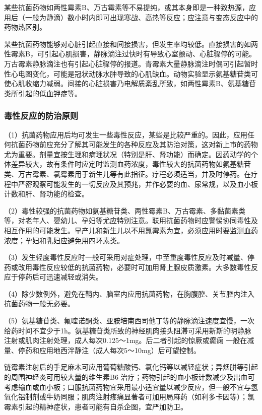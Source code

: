 某些抗菌药物如两性霉素B、万古霉素等不易提纯，或其本身即是一种致热源，应用后（一般为静滴）数小时内即可出现寒战、高热等反应；应注意与变态反应中的药物热区别。

某些抗菌药物能够对心脏引起直接和间接损害，但发生率均较低。直接损害的如两性霉素B，可引起心肌损害，静脉滴注过快时有导致心室颤动、心脏骤停的可能。万古霉素静脉滴注也有引起心脏骤停的报道。青霉素大量静脉滴注时偶可引起暂时性心电图变化，可能是冠状动脉水肿导致的心肌缺血。动物实验显示氨基糖苷类可使心肌收缩力减弱。间接的心脏损害乃电解质紊乱所致，如两性霉素B、氨基糖苷类所引起的低血钾症等。

\subsubsection{毒性反应的防治原则}

（1）抗菌药物应用后均可发生一些毒性反应，某些是比较严重的。因此，应用任何抗菌药物前应充分了解其可能发生的各种反应及其防治对策，这对新上市的药物尤为重要。剂量宜按生理和病理状况（特别是肝、肾功能）而确定。因药动学的个体差异较大，故有条件时应定时监测血药浓度，毒性较大的抗菌药物如氨基糖苷类、万古霉素、氯霉素用于新生儿等有此指征。疗程必须适当，并及时停药。在疗程中严密观察可能发生的一切反应及其预兆，并作必要的血、尿常规，以及血小板计数和肝、肾功能的检查。

（2）毒性较强的抗菌药物如氨基糖苷类、两性霉素B、万古霉素、多黏菌素类等，对老年人、婴幼儿、孕妇等尤应特别注意。联用抗菌药物时应警惕协同毒性及相互作用的可能发生。早产儿和新生儿以不用氯霉素为宜，必须应用时要监测血药浓度；孕妇和乳妇应避免用四环素类。

（3）发生轻度毒性反应时一般可采用对症处理，中至重度毒性反应及时减量、停药或改用毒性反应较低的抗菌药物，必要时可加用肾上腺皮质激素。大多数毒性反应于停药后可迅速减轻或消失。

（4）除少数例外，避免在鞘内、脑室内应用抗菌药物，在胸腹腔、关节腔内注入抗菌药物一般无必要。

（5）氨基糖苷类、氟喹诺酮类、亚胺培南西司他丁等的静脉滴注速度宜慢，一次给药时间不宜少于1h。氨基糖苷类所致的神经肌肉接头阻滞可采用新斯的明静脉注射或肌肉注射处理，成人每次0.125～1mg。后二者引起的惊厥或癫痫
一般在减量、停药和应用地西泮静注（成人每次5～10mg）后可望控制。

链霉素注射后的手足麻木可应用葡萄糖酸钙、氯化钙等以减轻症状；异烟肼等引起的周围神经炎可用较大量的维生素B{6}
治疗；药物引起的血小板计数减少及出血可考虑输血或血小板；口服抗菌药物宜采用最小适宜量以减少反应，但一般不宜与氢氧化铝制剂或牛奶同服；肌肉注射疼痛显著者可加用局麻药（如利多卡因等）；氯霉素引起的精神症状，患者可能有自杀企图，宜严加防卫。

